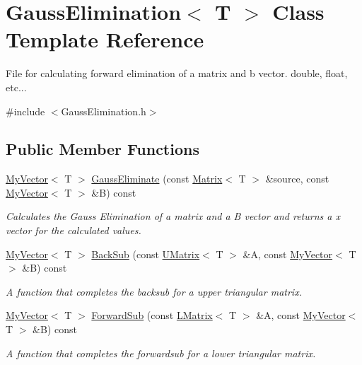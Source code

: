\hypertarget{class_gauss_elimination}{}\section{Gauss\+Elimination$<$ T $>$ Class Template Reference}
\label{class_gauss_elimination}


File for calculating forward elimination of a matrix and b vector. double, float, etc...  




{\ttfamily \#include $<$Gauss\+Elimination.\+h$>$}

\subsection*{Public Member Functions}
\begin{DoxyCompactItemize}
\item 
\mbox{\hyperlink{class_my_vector}{My\+Vector}}$<$ T $>$ \mbox{\hyperlink{class_gauss_elimination_a393e790f3c8ab830fad14120c552326c}{Gauss\+Eliminate}} (const \mbox{\hyperlink{class_matrix}{Matrix}}$<$ T $>$ \&source, const \mbox{\hyperlink{class_my_vector}{My\+Vector}}$<$ T $>$ \&B) const
\begin{DoxyCompactList}\small\item\em Calculates the Gauss Elimination of a matrix and a B vector and returns a x vector for the calculated values. \end{DoxyCompactList}\item 
\mbox{\hyperlink{class_my_vector}{My\+Vector}}$<$ T $>$ \mbox{\hyperlink{class_gauss_elimination_a44005dd8c4bcba5aa200a9532f75fb5b}{Back\+Sub}} (const \mbox{\hyperlink{class_u_matrix}{U\+Matrix}}$<$ T $>$ \&A, const \mbox{\hyperlink{class_my_vector}{My\+Vector}}$<$ T $>$ \&B) const
\begin{DoxyCompactList}\small\item\em A function that completes the backsub for a upper triangular matrix. \end{DoxyCompactList}\item 
\mbox{\hyperlink{class_my_vector}{My\+Vector}}$<$ T $>$ \mbox{\hyperlink{class_gauss_elimination_a2d069b26585ad8ec887bb496cd0076e7}{Forward\+Sub}} (const \mbox{\hyperlink{class_l_matrix}{L\+Matrix}}$<$ T $>$ \&A, const \mbox{\hyperlink{class_my_vector}{My\+Vector}}$<$ T $>$ \&B) const
\begin{DoxyCompactList}\small\item\em A function that completes the forwardsub for a lower triangular matrix. \end{DoxyCompactList}\item 

\end{DoxyCompactItemize}
